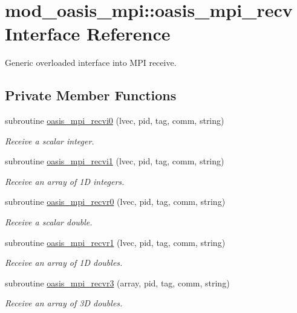 \hypertarget{interfacemod__oasis__mpi_1_1oasis__mpi__recv}{}\section{mod\+\_\+oasis\+\_\+mpi\+:\+:oasis\+\_\+mpi\+\_\+recv Interface Reference}
\label{interfacemod__oasis__mpi_1_1oasis__mpi__recv}


Generic overloaded interface into M\+PI receive.  


\subsection*{Private Member Functions}
\begin{DoxyCompactItemize}
\item 
subroutine \hyperlink{interfacemod__oasis__mpi_1_1oasis__mpi__recv_a074c7ea11bb2513a57792afe292a9305}{oasis\+\_\+mpi\+\_\+recvi0} (lvec, pid, tag, comm, string)
\begin{DoxyCompactList}\small\item\em Receive a scalar integer. \end{DoxyCompactList}\item 
subroutine \hyperlink{interfacemod__oasis__mpi_1_1oasis__mpi__recv_a7d8a63dcb97e7d155108fa6a26b1bfa4}{oasis\+\_\+mpi\+\_\+recvi1} (lvec, pid, tag, comm, string)
\begin{DoxyCompactList}\small\item\em Receive an array of 1D integers. \end{DoxyCompactList}\item 
subroutine \hyperlink{interfacemod__oasis__mpi_1_1oasis__mpi__recv_a6c501c168ddca69b50972959025044ff}{oasis\+\_\+mpi\+\_\+recvr0} (lvec, pid, tag, comm, string)
\begin{DoxyCompactList}\small\item\em Receive a scalar double. \end{DoxyCompactList}\item 
subroutine \hyperlink{interfacemod__oasis__mpi_1_1oasis__mpi__recv_a6706db7315d932b5ff3a1fff5c917ea8}{oasis\+\_\+mpi\+\_\+recvr1} (lvec, pid, tag, comm, string)
\begin{DoxyCompactList}\small\item\em Receive an array of 1D doubles. \end{DoxyCompactList}\item 
subroutine \hyperlink{interfacemod__oasis__mpi_1_1oasis__mpi__recv_a8a3e3cd1cd642121fb4cd943a744af68}{oasis\+\_\+mpi\+\_\+recvr3} (array, pid, tag, comm, string)
\begin{DoxyCompactList}\small\item\em Receive an array of 3D doubles. \end{DoxyCompactList}\end{DoxyCompactItemize}


